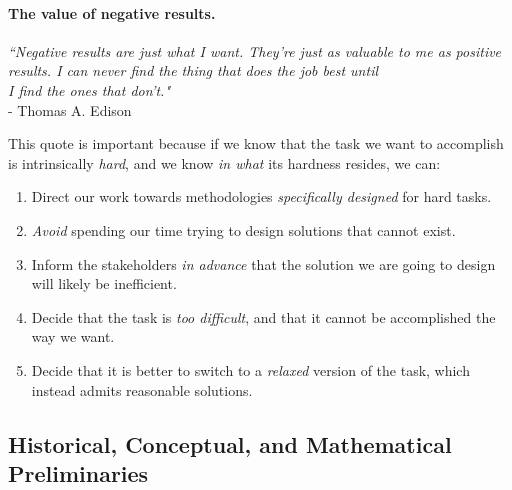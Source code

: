 \documentclass{article}
\begin{document}
			\paragraph{\large The value of negative results.}
			\mbox{}
			\vspace{0.1cm}
			
			\begin{pane}
				\centering
				\textit{``Negative results are just what I want. They're just as valuable to me as positive results. I can never find the thing that does the job best until}\\
				\textit{I find the ones that don't."}\\
				\raggedleft
				{\small - Thomas A. Edison}
			\end{pane}
			This quote is important because if we know that the task we want to accomplish is intrinsically \emph{hard}, and we know \emph{in what} its hardness resides, we can:
			\begin{enumerate}
				\item Direct our work towards methodologies \textit{specifically designed} for hard tasks.
				\vspace{-0.25cm}
				\item \textit{Avoid} spending our time trying to design solutions that cannot exist.
				\vspace{-0.25cm}
				\item Inform the stakeholders \textit{in advance} that the solution we are going to design will likely be inefficient.
				\vspace{-0.25cm}
				\item Decide that the task is \textit{too difficult}, and that it cannot be accomplished the way we want.
				\vspace{-0.25cm}
				\item Decide that it is better to switch to a \textit{relaxed} version of the task, which instead admits reasonable solutions.
			\end{enumerate}
		\subsection{Historical, Conceptual, and Mathematical Preliminaries}
\end{document}
